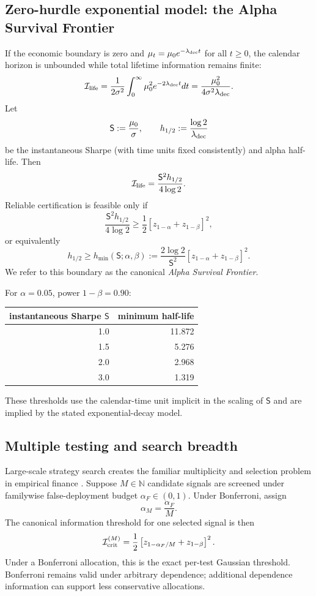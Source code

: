 \documentclass[11pt]{article}
\numberwithin{equation}{section}
\theoremstyle{plain}
\theoremstyle{definition}
\theoremstyle{remark}
\begin{document}
\subsection{Zero-hurdle exponential model: the Alpha Survival
Frontier}\label{zero-hurdle-exponential-model-the-alpha-survival-frontier}

If the economic boundary is zero and \(\mu_t=\mu_0e^{-{\lambda_{{\rm dec}}} t}\) for all
\(t\ge0\), the calendar horizon is unbounded while total lifetime information
remains finite: \[
\mathcal I_{\rm life}
=\frac1{2\sigma^2}\int_0^\infty\mu_0^2e^{-2{\lambda_{{\rm dec}}} t}dt
=\frac{\mu_0^2}{4\sigma^2{\lambda_{{\rm dec}}}}.
\] Let \[
\mathsf S:=\frac{\mu_0}{\sigma},
\qquad
h_{1/2}:=\frac{\log2}{{\lambda_{{\rm dec}}}}
\] be the instantaneous Sharpe (with time units fixed consistently) and
alpha half-life. Then \[
\mathcal I_{\rm life}
=\frac{\mathsf S^2h_{1/2}}{4\log2}.
\] Reliable certification is feasible only if \[
\frac{\mathsf S^2h_{1/2}}{4\log2}
\ge
\frac12[z_{1-\alpha}+z_{1-\beta}]^2,
\] or equivalently \[
h_{1/2}\ge h_{\min}(\mathsf S;\alpha,\beta)
:=\frac{2\log2}{\mathsf S^2}
[z_{1-\alpha}+z_{1-\beta}]^2.
\] We refer to this boundary as the canonical \emph{Alpha Survival Frontier}.

For \(\alpha=0.05\), power \(1-\beta=0.90\):

\begin{center}
\begin{tabular}{@{}rr@{}}
\toprule
instantaneous Sharpe $\mathsf S$ & minimum half-life \\
\midrule
1.0 & 11.872 \\
1.5 & 5.276 \\
2.0 & 2.968 \\
3.0 & 1.319 \\
\bottomrule
\end{tabular}
\end{center}

These thresholds use the calendar-time unit implicit in the scaling of $\mathsf S$ and are implied by the stated exponential-decay model.

\subsection{Multiple testing and search breadth}\label{multiple-search-tax}

Large-scale strategy search creates the familiar multiplicity and selection problem in empirical finance \cite{harveyliu2016,baileyloprado2014,baileyborwein2017}. Suppose $M\in\mathbb N$ candidate signals are screened under familywise
false-deployment budget $\alpha_F\in(0,1)$. Under Bonferroni, assign \[
\alpha_M=\frac{\alpha_F}{M}.
\] The canonical information threshold for one selected signal is then
\[
\mathcal I_{\rm crit}^{(M)}
=\frac12\left[
 z_{1-\alpha_F/M}+z_{1-\beta}
\right]^2.
\] Under a Bonferroni allocation, this is the exact per-test Gaussian threshold. Bonferroni remains valid under arbitrary dependence; additional dependence information can support less conservative allocations.
\end{document}
